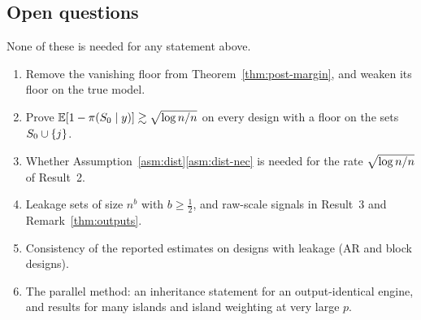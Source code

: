 \subsection{Open questions}\label{sec:open}

None of these is needed for any statement above.
\begin{enumerate}[leftmargin=1.5em,itemsep=1pt]
  \item Remove the vanishing floor  from Theorem~\ref{thm:post-margin}, and weaken its floor on the true model.
  \item Prove $\operatorname{\mathbb{E}}[1-\pi(S_0\mid y)]\gtrsim\sqrt{\log n/n}$ on every design with a floor on the sets $S_0\cup\{j\}$.
  \item Whether Assumption~\ref{asm:dist}\ref{asm:dist-nec} is needed for the rate $\sqrt{\log n/n}$ of Result~2.
  \item Leakage sets of size $n^b$ with $b\ge\tfrac12$, and raw-scale signals in Result~3 and Remark~\ref{thm:outputs}.
  \item Consistency of the reported estimates on designs with leakage (AR and block designs).
  \item The parallel method: an inheritance statement for an output-identical engine, and results for many islands and
    island weighting at very large $p$.
\end{enumerate}

